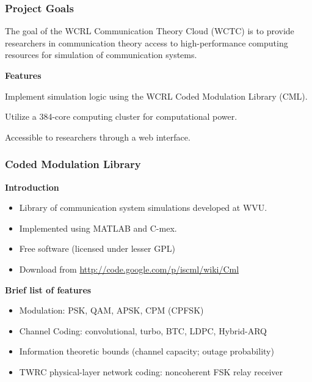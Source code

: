 \begin{frame}
\frametitle{Project Goals}

The goal of the WCRL Communication Theory Cloud (WCTC) is to provide researchers in communication theory
access to high-performance computing resources for simulation of communication systems.

\vspace{5mm}

\textbf{Features}
\begin{itemize_loose}
\item Implement simulation logic using the WCRL Coded Modulation Library (CML).
\item Utilize a 384-core computing cluster for computational power.
\item Accessible to researchers through a web interface.
\end{itemize_loose}
\end{frame}


\begin{frame}
\frametitle{Coded Modulation Library}

\textbf{Introduction}
\begin{itemize}
\item Library of communication system simulations developed at WVU.
\item Implemented using MATLAB and C-mex.
\item Free software (licensed under lesser GPL)
\item Download from \url{http://code.google.com/p/iscml/wiki/Cml}
\end{itemize}

\vspace{5mm}
\textbf{Brief list of features}
\begin{itemize}
\item Modulation: PSK, QAM, APSK, CPM (CPFSK)
\item Channel Coding: convolutional, turbo, BTC, LDPC, Hybrid-ARQ
\item Information theoretic bounds (channel capacity; outage probability)
\item TWRC physical-layer network coding: noncoherent FSK relay receiver
\end{itemize}
\end{frame}




